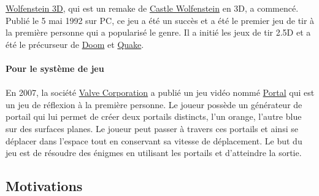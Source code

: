 \documentclass[12pt]{report}
\begin{document}
\href{https://fr.wikipedia.org/wiki/Wolfenstein_3D}{Wolfenstein 3D}, qui est un remake de \href{https://fr.wikipedia.org/wiki/Castle_Wolfenstein}{Castle Wolfenstein}
en 3D, a commencé. Publié le 5 mai 1992 sur PC, ce jeu a été un succès et a été le premier jeu de tir à la première personne qui a popularisé le genre.
Il a initié les jeux de tir 2.5D et a été le précurseur de \href{https://fr.wikipedia.org/wiki/Doom_(jeu_vid%C3%A9o,_1993)}{Doom} et
\href{https://fr.wikipedia.org/wiki/Quake}{Quake}.

\paragraph{Pour le système de jeu}
\paragraph{}
En 2007, la société \href{https://fr.wikipedia.org/wiki/Valve_Corporation}{Valve Corporation} a publié un jeu vidéo nommé
\href{https://fr.wikipedia.org/wiki/Portal_(jeu_vid%C3%A9o)}{Portal} qui est un 
jeu de réflexion à la première personne. Le joueur possède un générateur de portail qui lui permet de créer deux portails distincts,
l'un orange, l'autre blue sur des surfaces planes. Le joueur peut passer à travers ces portails et ainsi se déplacer dans l'espace
tout en conservant sa vitesse de déplacement. Le but du jeu est de résoudre des énigmes en utilisant les portails et d'atteindre la sortie.

\clearpage

\subsection{Motivations}

\paragraph{}
\end{document}
